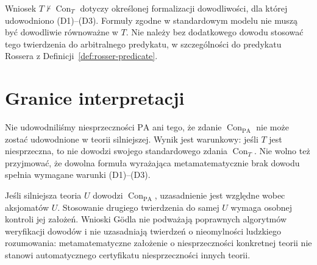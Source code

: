 \begin{uwaga}
Wniosek $T\nvdash\operatorname{Con}_T$
dotyczy określonej formalizacji dowodliwości,
dla której udowodniono (D1)--(D3).
Formuły zgodne w standardowym modelu nie muszą
być dowodliwie równoważne w $T$.
Nie należy bez dodatkowego dowodu stosować
tego twierdzenia do arbitralnego predykatu,
w szczególności do predykatu Rossera
z Definicji~\ref{def:rosser-predicate}.
\end{uwaga}

\section{Granice interpretacji}
\begin{uwaga}
Nie udowodniliśmy niesprzeczności $\mathrm{PA}$
ani tego, że zdanie $\operatorname{Con}_{\mathrm{PA}}$
nie może zostać udowodnione w teorii silniejszej.
Wynik jest warunkowy: jeśli $T$ jest niesprzeczna,
to nie dowodzi swojego standardowego zdania
$\operatorname{Con}_T$. Nie wolno też przyjmować,
że dowolna formuła wyrażająca metamatematycznie
brak dowodu spełnia wymagane warunki (D1)--(D3).
\end{uwaga}

\begin{uwaga}
Jeśli silniejsza teoria $U$ dowodzi
$\operatorname{Con}_{\mathrm{PA}}$, uzasadnienie
jest względne wobec aksjomatów $U$.
Stosowanie drugiego twierdzenia do samej $U$
wymaga osobnej kontroli jej założeń.
Wnioski Gödla nie podważają poprawnych
algorytmów weryfikacji dowodów i nie uzasadniają
twierdzeń o nieomylności ludzkiego rozumowania:
metamatematyczne założenie o niesprzeczności
konkretnej teorii nie stanowi automatycznego
certyfikatu niesprzeczności innych teorii.
\end{uwaga}
